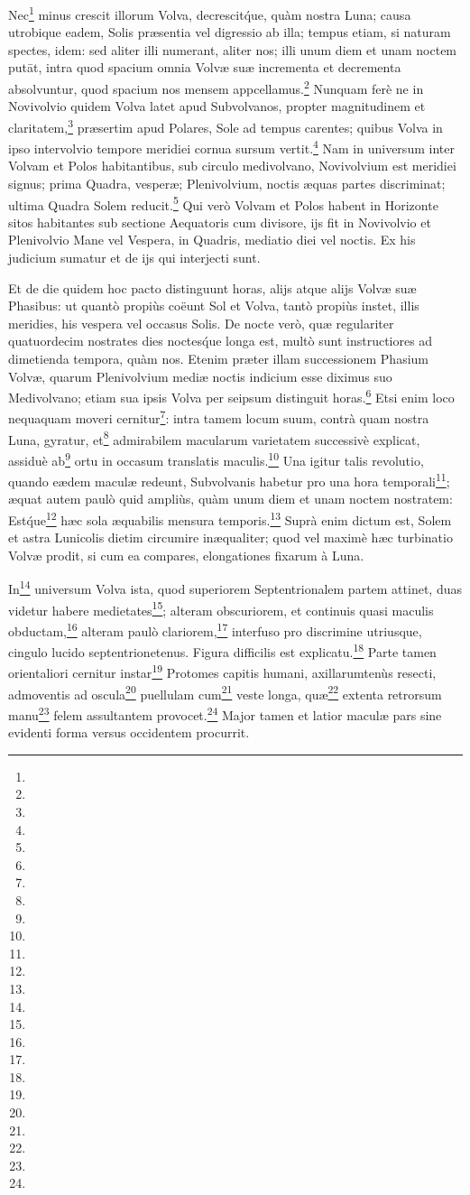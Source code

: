 \documentclass[a4paper, 11pt, oneside, polutonikogreek, german]{article}
\begin{document}
Nec\footnote{} minus crescit illorum Volva, decrescit\'que, quàm nostra Luna; causa utrobique eadem, Solis præsentia vel digressio ab illa; tempus etiam, si naturam spectes, idem: sed aliter illi numerant, aliter nos; illi unum diem et unam noctem putāt, intra quod spacium omnia Volvæ suæ incrementa et decrementa absolvuntur, quod spacium nos mensem appcellamus.\footnote{} Nunquam ferè ne in Novivolvio quidem Volva latet apud Subvolvanos, propter magnitudinem et claritatem,\footnote{} præsertim apud Polares, Sole ad tempus carentes; quibus Volva in ipso intervolvio tempore meridiei cornua sursum vertit.\footnote{} Nam in universum inter Volvam et Polos habitantibus, sub circulo medivolvano, Novivolvium est meridiei signus; prima Quadra, vesperæ; Plenivolvium, noctis æquas partes discriminat; ultima Quadra Solem reducit.\footnote{} Qui verò Volvam et Polos habent in Horizonte sitos habitantes sub sectione Aequatoris cum divisore, ijs fit in Novivolvio et Plenivolvio Mane vel Vespera, in Quadris, mediatio diei vel noctis. Ex his judicium sumatur et de ijs qui interjecti sunt.

Et de die quidem hoc pacto distinguunt horas, alijs atque alijs Volvæ suæ Phasibus: ut quantò propiùs coëunt Sol et Volva, tantò propiùs instet, illis meridies, his vespera vel occasus Solis. De nocte verò, quæ regulariter quatuordecim nostrates dies noctes\'que longa est, multò sunt instructiores ad dimetienda tempora, quàm nos. Etenim præter illam successionem Phasium Volvæ, quarum Plenivolvium mediæ noctis indicium esse diximus suo Medivolvano; etiam sua ipsis Volva per seipsum distinguit horas.\footnote{} Etsi enim loco nequaquam moveri cernitur\footnote{}: intra tamem locum suum, contrà quam nostra Luna, gyratur, et\footnote{} admirabilem macularum varietatem successivè explicat, assiduè ab\footnote{} ortu in occasum translatis maculis.\footnote{} Una igitur talis revolutio, quando eædem maculæ redeunt, Subvolvanis habetur pro una hora temporali\footnote{}; æquat autem paulò quid ampliùs, quàm unum diem et unam noctem nostratem: Est\'que\footnote{} hæc sola æquabilis mensura temporis.\footnote{} Suprà enim dictum est, Solem et astra Lunicolis dietim circumire inæqualiter; quod vel maximè hæc turbinatio Volvæ prodit, si cum ea compares, elongationes fixarum à Luna.

In\footnote{} universum Volva ista, quod superiorem Septentrionalem partem attinet, duas videtur habere medietates\footnote{}; alteram obscuriorem, et continuis quasi maculis obductam,\footnote{} alteram paulò clariorem,\footnote{} interfuso pro discrimine utriusque, cingulo lucido septentrionetenus. Figura difficilis est explicatu.\footnote{} Parte tamen orientaliori cernitur instar\footnote{} Protomes capitis humani, axillarumtenùs resecti, admoventis ad oscula\footnote{} puellulam cum\footnote{} veste longa, quæ\footnote{} extenta retrorsum manu\footnote{} felem assultantem provocet.\footnote{} Major tamen et latior maculæ pars sine evidenti forma versus occidentem procurrit.
\end{document}

